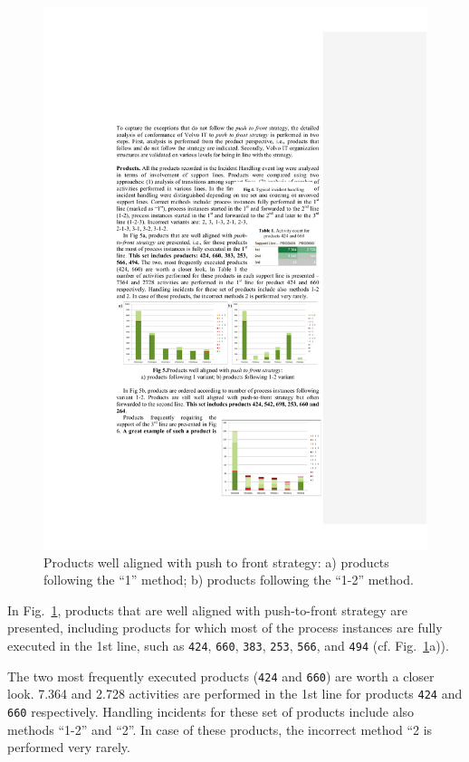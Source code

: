 \documentclass[lnbip]{svmultln}
\begin{document}
\begin{figure}
\centering
\includegraphics[width=\textwidth]{"figs/pic 7"}
\caption{Products well aligned with push to front strategy:
a) products following the ``1'' method; b) products following the ``1-2'' method.}
\label{fig:push2FrontAlignedProducts}
\end{figure}

In Fig.~\ref{fig:push2FrontAlignedProducts}, products that are well aligned with push-to-front strategy are presented, including products for which most of the process instances are fully executed in the 1st line, such as \texttt{424}, \texttt{660}, \texttt{383}, \texttt{253}, \texttt{566}, and \texttt{494} (cf. Fig.~\ref{fig:push2FrontAlignedProducts}a)). 

The two most frequently executed products (\texttt{424} and \texttt{660}) are worth a closer look. 7.364 and 2.728 activities are performed in the 1st line for products \texttt{424} and \texttt{660} respectively. Handling incidents for these set of products include also methods ``1-2'' and ``2''. In case of these products, the incorrect method ``2 is performed very rarely.
\end{document}

